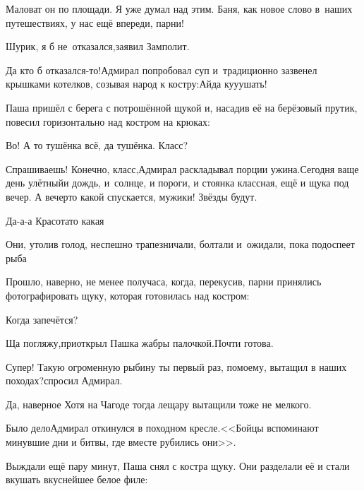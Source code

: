 \diagdash Маловат он по площади. Я уже думал над этим. Баня, как новое слово в~наших путешествиях, у нас ещё впереди, парни!

\diagdash Шурик, я б не~отказался,\mdash заявил Замполит.

\diagdash Да кто б отказался-то!\mdash Адмирал попробовал суп и~традиционно зазвенел крышками котелков, созывая народ к костру:\mdash Айда ку\sdash у\sdash ушать!

Паша пришёл с берега с потрошённой щукой и, насадив её на берёзовый прутик, повесил горизонтально над костром на крюках:

\diagdash Во! А то тушёнка всё, да тушёнка. Класс?

\diagdash Спрашиваешь! Конечно, класс,\mdash Адмирал раскладывал порции ужина.\mdash Сегодня ваще день улётный\mdash и дождь, и~солнце, и пороги, и стоянка классная, ещё и щука под вечер. А вечер\sdash то какой спускается, мужики! Звёзды будут.

\diagdash Да-а-а\myldots{} Красота\sdash то какая\myldots{}

Они, утолив голод, неспешно трапезничали, болтали и~ожидали, пока подоспеет рыба\myldots{}

\vspace{0.5cm}
\myldots{}Прошло, наверно, не менее получаса, когда, перекусив, парни принялись фотографировать щуку, которая готовилась над костром:

\diagdash Когда запечётся?


\diagdash Ща погляжу,\mdash приоткрыл Пашка жабры палочкой.\mdash Почти готова.

\diagdash Супер! Такую огроменную рыбину ты первый раз, по\sdash моему, вытащил в наших походах?\mdash спросил Адмирал.

\diagdash Да, наверное\myldots{} Хотя на Чагоде тогда лещару вытащили тоже не мелкого.

\diagdash Было дело\myldots{}\mdash Адмирал откинулся в походном кресле.\mdash <<Бойцы вспоминают минувшие дни и битвы, где вместе рубились они>>.

Выждали ещё пару минут, Паша снял с костра щуку. Они разделали её и стали вкушать вкуснейшее белое филе:

